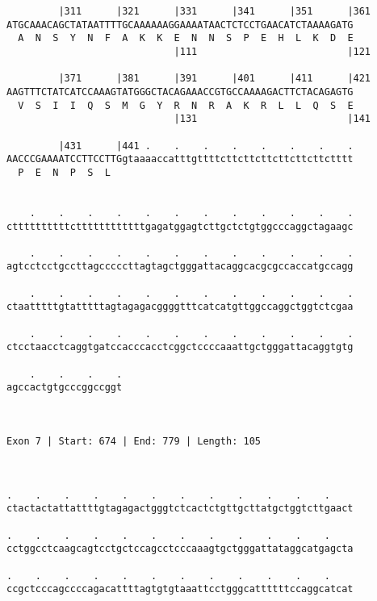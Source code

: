 \documentclass{article}
\begin{document}
\begin{Verbatim}
         |311      |321      |331      |341      |351      |361
ATGCAAACAGCTATAATTTTGCAAAAAAGGAAAATAACTCTCCTGAACATCTAAAAGATG
  A  N  S  Y  N  F  A  K  K  E  N  N  S  P  E  H  L  K  D  E
                             |111                          |121
  
         |371      |381      |391      |401      |411      |421
AAGTTTCTATCATCCAAAGTATGGGCTACAGAAACCGTGCCAAAAGACTTCTACAGAGTG
  V  S  I  I  Q  S  M  G  Y  R  N  R  A  K  R  L  L  Q  S  E
                             |131                          |141
  
         |431      |441 .    .    .    .    .    .    .    .
AACCCGAAAATCCTTCCTTGgtaaaaccatttgttttcttcttcttcttcttcttctttt
  P  E  N  P  S  L                                          
                                                            
  
    .    .    .    .    .    .    .    .    .    .    .    .
cttttttttttcttttttttttttgagatggagtcttgctctgtggcccaggctagaagc
                                                            
    .    .    .    .    .    .    .    .    .    .    .    .
agtcctcctgccttagcccccttagtagctgggattacaggcacgcgccaccatgccagg
                                                            
    .    .    .    .    .    .    .    .    .    .    .    .
ctaatttttgtatttttagtagagacggggtttcatcatgttggccaggctggtctcgaa
                                                            
    .    .    .    .    .    .    .    .    .    .    .    .
ctcctaacctcaggtgatccacccacctcggctccccaaattgctgggattacaggtgtg
                                                            
    .    .    .    .
agccactgtgcccggccggt
                    
                    
 
Exon 7 | Start: 674 | End: 779 | Length: 105



.    .    .    .    .    .    .    .    .    .    .    .    
ctactactattattttgtagagactgggtctcactctgttgcttatgctggtcttgaact
                                                            
.    .    .    .    .    .    .    .    .    .    .    .    
cctggcctcaagcagtcctgctccagcctcccaaagtgctgggattataggcatgagcta
                                                            
.    .    .    .    .    .    .    .    .    .    .    .    
ccgctcccagccccagacattttagtgtgtaaattcctgggcattttttccaggcatcat
                                                            

\end{Verbatim}
\end{document}
